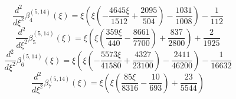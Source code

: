 \begin{equation}
\frac{d^{2}}{d\xi^{2}}\beta_{4}^{(5,14)} (\xi) =
 \xi \left(\xi \left(- \frac{4645 \xi}{1512} + \frac{2095}{504}\right) - \frac{1031}{1008}\right) - \frac{1}{112}
\end{equation}
\begin{equation}
\frac{d^{2}}{d\xi^{2}}\beta_{5}^{(5,14)} (\xi) =
 \xi \left(\xi \left(\frac{359 \xi}{440} - \frac{8661}{7700}\right) + \frac{837}{2800}\right) + \frac{2}{1925}
\end{equation}
\begin{equation}
\frac{d^{2}}{d\xi^{2}}\beta_{6}^{(5,14)} (\xi) =
 \xi \left(\xi \left(- \frac{5573 \xi}{41580}
 + \frac{4327}{23100}\right) - \frac{2411}{46200}\right) - \frac{1}{16632}
\end{equation}
\begin{equation}
\frac{d^{2}}{d\xi^{2}}\beta_{7}^{(5,14)} (\xi) =
 \xi \left(\xi \left(\frac{85 \xi}{8316} - \frac{10}{693}\right) + \frac{23}{5544}\right)
\end{equation}
